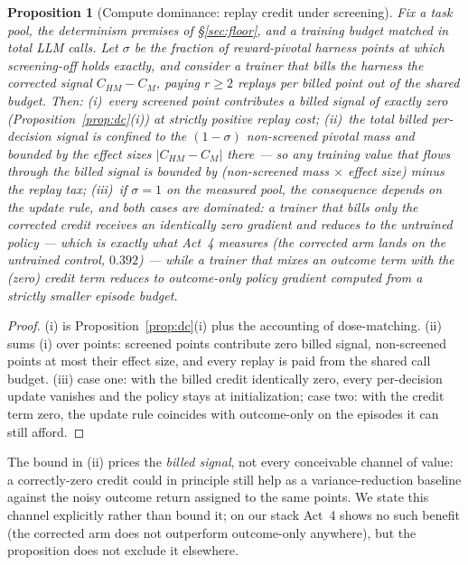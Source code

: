 \documentclass{article}
\newtheorem{proposition}{Proposition}
\theoremstyle{remark}
\begin{document}
\begin{proposition}[Compute dominance: replay credit under screening]
\label{prop:nfl}
Fix a task pool, the determinism premises of \S\ref{sec:floor}, and a
training budget matched in total LLM calls. Let $\sigma$ be the fraction of
reward-pivotal harness points at which screening-off holds exactly, and
consider a trainer that bills the harness the corrected signal
$C_{HM} - C_M$, paying $r \geq 2$ replays per billed point out of the
shared budget. Then: (i)~every screened point contributes a billed signal
of \emph{exactly zero} (Proposition~\ref{prop:dc}(i)) at strictly positive
replay cost; (ii)~the total \emph{billed per-decision signal} is confined
to the $(1-\sigma)$ non-screened pivotal mass and bounded by the effect
sizes $|C_{HM} - C_M|$ there --- so any training value that flows through
the billed signal is bounded by (non-screened mass $\times$ effect size)
minus the replay tax; (iii)~if $\sigma = 1$ on the measured pool, the
consequence depends on the update rule, and both cases are dominated: a
trainer that bills \emph{only} the corrected credit receives an
identically zero gradient and reduces to the \emph{untrained} policy ---
which is exactly what Act~4 measures (the corrected arm lands on the
untrained control, $0.392$) --- while a trainer that mixes an outcome term
with the (zero) credit term reduces to outcome-only policy gradient
computed from a strictly smaller episode budget.
\end{proposition}
\begin{proof}
(i) is Proposition~\ref{prop:dc}(i) plus the accounting of dose-matching.
(ii) sums (i) over points: screened points contribute zero billed signal,
non-screened points at most their effect size, and every replay is paid
from the shared call budget. (iii) case one: with the billed credit
identically zero, every per-decision update vanishes and the policy stays
at initialization; case two: with the credit term zero, the update rule
coincides with outcome-only on the episodes it can still afford.
\end{proof}

The bound in (ii) prices the \emph{billed signal}, not every conceivable
channel of value: a correctly-zero credit could in principle still help as
a variance-reduction baseline against the noisy outcome return assigned to
the same points. We state this channel explicitly rather than bound it;
on our stack Act~4 shows no such benefit (the corrected arm does not
outperform outcome-only anywhere), but the proposition does not exclude it
elsewhere.
\end{document}
